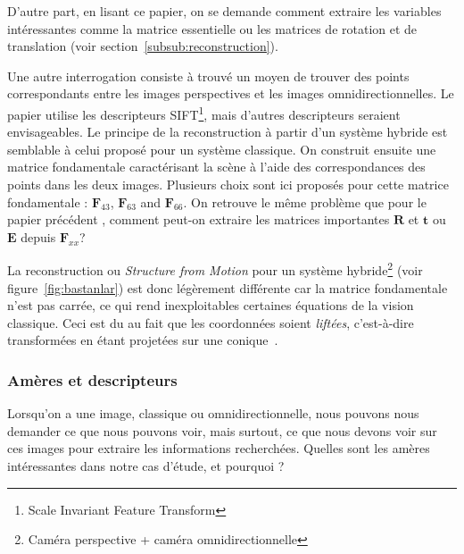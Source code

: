 D'autre part, en lisant ce papier, on se demande comment extraire les variables intéressantes comme la matrice essentielle ou les matrices de rotation et de translation (voir section~\ref{subsub:reconstruction}).

Une autre interrogation consiste à trouvé un moyen de trouver des points correspondants entre les images perspectives et les images omnidirectionnelles.
Le papier \cite{Puig08} utilise les descripteurs SIFT\footnote{Scale Invariant Feature Transform}, mais d'autres descripteurs seraient envisageables.
Le principe de la reconstruction à partir d'un système hybride est semblable à celui proposé pour un système classique.
On construit ensuite une matrice fondamentale caractérisant la scène à l'aide des correspondances des points dans les deux images.
Plusieurs choix sont ici proposés pour cette matrice fondamentale : $\mathbf{F}_{43}$, $\mathbf{F}_{63}$ and $\mathbf{F}_{66}$.
On retrouve le même problème que pour le papier précédent \cite{Sturm02}, comment peut-on extraire les matrices importantes $\mathbf{R}$ et $\mathbf{t}$ ou $\mathbf{E}$ depuis $\mathbf{F}_{xx}$?

 
  La reconstruction ou \emph{Structure from Motion} pour un système hybride\footnote{Caméra perspective + caméra omnidirectionnelle} \cite{Bastanlar09PhD} (voir figure~\ref{fig:bastanlar}) est donc légèrement différente car la matrice fondamentale n'est pas carrée, ce qui rend inexploitables certaines équations de la vision classique.
Ceci est du au fait que les coordonnées soient \emph{liftées}, c'est-à-dire transformées en étant projetées sur une conique~\cite{Sturm07}.


\subsubsection{Amères et descripteurs}

Lorsqu'on a une image, classique ou omnidirectionnelle, nous pouvons nous demander ce que nous pouvons voir, mais surtout, ce que nous devons voir sur ces images pour extraire les informations recherchées.
Quelles sont les amères intéressantes dans notre cas d'étude, et pourquoi ?

